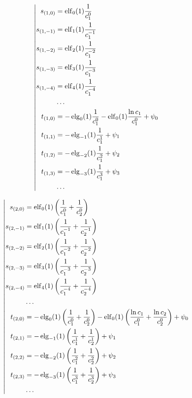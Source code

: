 \begin{equation*} \left| \begin{aligned}
s_{(1,0)} &=
  \elf_0(1) \frac{1}{c_1^0} \\
%
s_{(1,-1)} &=
  \elf_1(1) \frac{1}{c_1^{-1}} \\
%
s_{(1,-2)} &=
  \elf_2(1) \frac{1}{c_1^{-2}} \\
%
s_{(1,-3)} &=
  \elf_3(1) \frac{1}{c_1^{-3}} \\
%
s_{(1,-4)} &=
  \elf_4(1) \frac{1}{c_1^{-4}} \\
%
&\ldots \\
%
t_{(1,0)} &=
- \elg_0(1) \frac{1}{c_1^0}
- \elf_0(1) \frac{\ln{c_1}}{c_1^0}
+ \psi_0 \\
%
t_{(1,1)} &=
- \elg_{-1}(1) \frac{1}{c_1^1}
+ \psi_1 \\
%
t_{(1,2)} &=
- \elg_{-2}(1) \frac{1}{c_1^2}
+ \psi_2 \\
%
t_{(1,3)} &=
- \elg_{-3}(1) \frac{1}{c_1^3}
+ \psi_3 \\
%
&\ldots \\
\end{aligned} \right. \end{equation*}

\begin{equation*} \left| \begin{aligned}
s_{(2,0)} &=
  \elf_0(1) \left(
  \frac{1}{c_1^0}
+ \frac{1}{c_2^0} \right) \\
%
s_{(2,-1)} &=
  \elf_1(1) \left(
  \frac{1}{c_1^{-1}}
+ \frac{1}{c_2^{-1}} \right) \\
%
s_{(2,-2)} &=
  \elf_2(1) \left(
  \frac{1}{c_1^{-2}}
+ \frac{1}{c_2^{-2}} \right) \\
%
s_{(2,-3)} &=
  \elf_3(1) \left(
  \frac{1}{c_1^{-3}}
+ \frac{1}{c_2^{-3}} \right) \\
%
s_{(2,-4)} &=
  \elf_4(1) \left(
  \frac{1}{c_1^{-4}}
+ \frac{1}{c_2^{-4}} \right) \\
%
&\ldots \\
%
t_{(2,0)} &=
- \elg_0(1) \left(
  \frac{1}{c_1^0}
+ \frac{1}{c_2^0} \right)
- \elf_0(1) \left(
  \frac{\ln{c_1}}{c_1^0}
+ \frac{\ln{c_2}}{c_2^0} \right)
+ \psi_0 \\
%
t_{(2,1)} &=
- \elg_{-1}(1) \left(
  \frac{1}{c_1^1}
+ \frac{1}{c_2^1} \right)
+ \psi_1 \\
%
t_{(2,2)} &=
- \elg_{-2}(1) \left(
  \frac{1}{c_1^2}
+ \frac{1}{c_2^2} \right)
+ \psi_2 \\
%
t_{(2,3)} &=
- \elg_{-3}(1) \left(
  \frac{1}{c_1^3}
+ \frac{1}{c_2^3} \right)
+ \psi_3 \\
%
&\ldots \\
\end{aligned} \right. \end{equation*}

